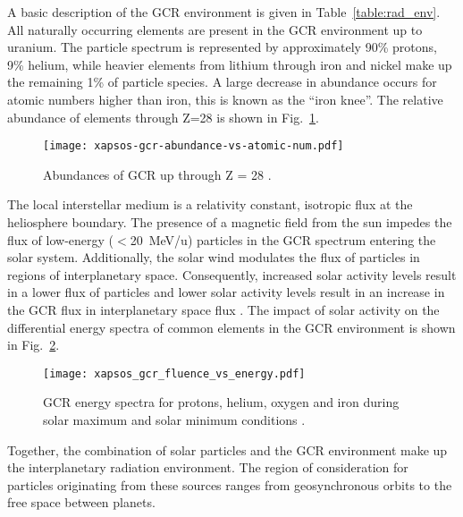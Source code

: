 A basic description of the GCR environment is given in Table~\ref{table:rad_env}.
All naturally occurring elements are present in the GCR environment up to uranium.
The particle spectrum is represented by approximately 90\% protons, 9\% helium, while heavier elements from lithium through iron and nickel make up the remaining 1\% of particle species.
A large decrease in abundance occurs for atomic numbers higher than iron, this is known as the ``iron knee''.
The relative abundance of elements through Z=28 is shown in Fig.~\ref{fig:gcr-abundance-vs-atomic-num}.
\begin{figure}[htbp]
    \begin{center}
        \texttt{[image: xapsos-gcr-abundance-vs-atomic-num.pdf]}
    \end{center}
    \caption[Abundances of GCR up through Z = 28.]{Abundances of GCR up through Z = 28 \cite{xapsos:2006}.}
    \label{fig:gcr-abundance-vs-atomic-num}
\end{figure}

The local interstellar medium is a relativity constant, isotropic flux at the heliosphere boundary.
The presence of a magnetic field from the sun impedes the flux of low-energy ($<$20~MeV/u) particles in the GCR spectrum entering the solar system.
Additionally, the solar wind modulates the flux of particles in regions of interplanetary space.
Consequently, increased solar activity levels result in a lower flux of particles and lower solar activity levels result in an increase in the GCR flux in interplanetary space flux \cite{parker1965passage,badhwar1992improved}.
The impact of solar activity on the differential energy spectra of common elements in the GCR environment is shown in Fig.~\ref{fig:gcr-fluence-vs-energy}.
\begin{figure}[htbp]
    \begin{center}
        \texttt{[image: xapsos\_gcr\_fluence\_vs\_energy.pdf]}
    \end{center}
    \caption[GCR energy spectra for protons, helium, oxygen and iron during solar maximum and solar minimum conditions.]{GCR energy spectra for protons, helium, oxygen and iron during solar maximum and solar minimum conditions \cite{badhwar1996galactic}.}
    \label{fig:gcr-fluence-vs-energy}
\end{figure}
Together, the combination of solar particles and the GCR environment make up the interplanetary radiation environment.
The region of consideration for particles originating from these sources ranges from geosynchronous orbits to the free space between planets.

